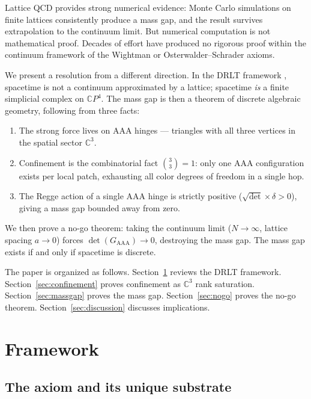 \documentclass[12pt]{article}
\theoremstyle{remark}
\begin{document}
\noindent
Lattice QCD \cite{Wilson, Creutz} provides strong numerical evidence:
Monte Carlo simulations on finite lattices consistently produce a mass
gap, and the result survives extrapolation to the continuum limit. But
numerical computation is not mathematical proof. Decades of effort have
produced no rigorous proof within the continuum framework of the Wightman
\cite{Wightman} or Osterwalder--Schrader \cite{OS} axioms.

We present a resolution from a different direction. In the DRLT framework
\cite{DRLT, DRLT-rep}, spacetime is not a continuum approximated by a
lattice; spacetime \emph{is} a finite simplicial complex on
$\mathbb{C}P^4$. The mass gap is then a theorem of discrete algebraic
geometry, following from three facts:

\begin{enumerate}
\item The strong force lives on AAA hinges --- triangles with all three
  vertices in the spatial sector $\mathbb{C}^3$.
\item Confinement is the combinatorial fact $\binom{3}{3} = 1$: only one
  AAA configuration exists per local patch, exhausting all color degrees
  of freedom in a single hop.
\item The Regge action of a single AAA hinge is strictly positive
  ($\sqrt{\det} \times \delta > 0$), giving a mass gap bounded away
  from zero.
\end{enumerate}

We then prove a no-go theorem: taking the continuum limit
($N \to \infty$, lattice spacing $a \to 0$) forces
$\det(G_{\mathrm{AAA}}) \to 0$, destroying the mass gap. The mass gap
exists if and only if spacetime is discrete.

The paper is organized as follows. Section~\ref{sec:framework} reviews
the DRLT framework. Section~\ref{sec:confinement} proves confinement as
$\mathbb{C}^3$ rank saturation. Section~\ref{sec:massgap} proves the
mass gap. Section~\ref{sec:nogo} proves the no-go theorem.
Section~\ref{sec:discussion} discusses implications.

\section{Framework}
\label{sec:framework}

\subsection{The axiom and its unique substrate}
\end{document}
